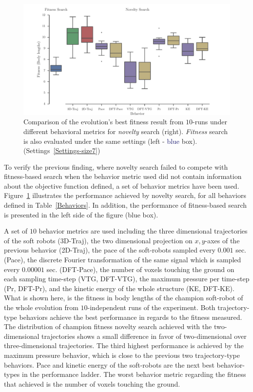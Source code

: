 \begin{figure}[t!]
\centering
\includegraphics[width=1.0\textwidth]{../Figures/Results/BehaviorsPerformance.pdf}
\caption{Comparison of the evolution's best fitness result from $10$-runs under different behavioral metrics for \emph{novelty} search (right). \emph{Fitness} search is also evaluated under the same settings (left - \textcolor{MidnightBlue}{blue} box). (Settings~\ref{Settings-size7})}
\label{fig:BehaviorsPerformance}
\end{figure}

To verify the previous finding, where novelty search failed to compete with fitness-based search when the behavior metric used did not contain information about the objective function defined, a set of behavior metrics have been used. Figure~\ref{fig:BehaviorsPerformance} illustrates the performance achieved by novelty search, for all behaviors defined in Table~\ref{Behaviors}. In addition, the performance of fitness-based search is presented in the left side of the figure (\textcolor{NavyBlue}{blue} box).

A set of $10$ behavior metrics are used including the three dimensional trajectories of the soft robots (3D-Traj), the two dimensional projection on $x,y$-axes of the previous behavior (2D-Traj), the pace of the soft-robots sampled every $0.001$ sec. (Pace), the discrete Fourier transformation of the same signal which is sampled every $0.00001$ sec. (DFT-Pace), the number of voxels touching the ground on each sampling time-step (VTG, DFT-VTG), the maximum pressure per time-step (Pr, DFT-Pr), and the kinetic energy of the whole structure (KE, DFT-KE). What is shown here, is the fitness in body lengths of the champion soft-robot of the whole evolution from $10$-independent runs of the experiment. Both trajectory-type behaviors achieve the best performance in regards to the fitness measured. The distribution of champion fitness novelty search achieved with the two-dimensional trajectories shows a small difference in favor of two-dimensional over three-dimensional trajectories. The third highest performance is achieved by the maximum pressure behavior, which is close to the previous two trajectory-type behaviors. Pace and kinetic energy of the soft-robots are the next best behavior-types in the performance ladder. The worst behavior metric regarding the fitness that achieved is the number of voxels touching the ground.

